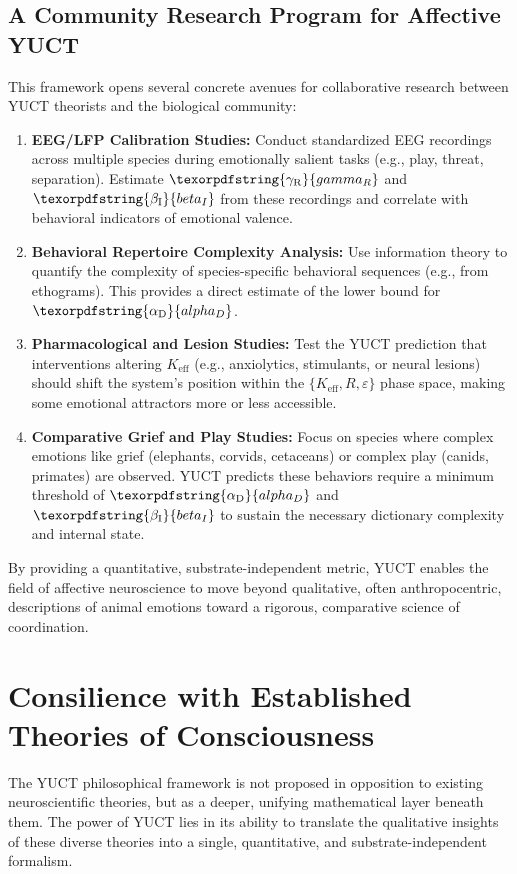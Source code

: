 \documentclass[12pt,a4paper]{article}
\DeclareRobustCommand{\alD}{\texorpdfstring{\ensuremath{\alpha_{\mathrm{D}}}}{alpha_D}}
\DeclareRobustCommand{\beI}{\texorpdfstring{\ensuremath{\beta_{\mathrm{I}}}}{beta_I}}
\DeclareRobustCommand{\gaR}{\texorpdfstring{\ensuremath{\gamma_{\mathrm{R}}}}{gamma_R}}
\begin{document}
	\subsection{A Community Research Program for Affective YUCT}
	
	This framework opens several concrete avenues for collaborative research between YUCT theorists and the biological community:
	
	\begin{enumerate}
		\item \textbf{EEG/LFP Calibration Studies:} Conduct standardized EEG recordings across multiple species during emotionally salient tasks (e.g., play, threat, separation). Estimate \(\gaR\) and \(\beI\) from these recordings and correlate with behavioral indicators of emotional valence.
		\item \textbf{Behavioral Repertoire Complexity Analysis:} Use information theory to quantify the complexity of species-specific behavioral sequences (e.g., from ethograms). This provides a direct estimate of the lower bound for \(\alD\).
		\item \textbf{Pharmacological and Lesion Studies:} Test the YUCT prediction that interventions altering \(K_{\mathrm{eff}}\) (e.g., anxiolytics, stimulants, or neural lesions) should shift the system's position within the \(\{K_{\mathrm{eff}}, R, \varepsilon\}\) phase space, making some emotional attractors more or less accessible.
		\item \textbf{Comparative Grief and Play Studies:} Focus on species where complex emotions like grief (elephants, corvids, cetaceans) or complex play (canids, primates) are observed. YUCT predicts these behaviors require a minimum threshold of \(\alD\) and \(\beI\) to sustain the necessary dictionary complexity and internal state.
	\end{enumerate}
	
	By providing a quantitative, substrate-independent metric, YUCT enables the field of affective neuroscience to move beyond qualitative, often anthropocentric, descriptions of animal emotions toward a rigorous, comparative science of coordination.
	
	\section{Consilience with Established Theories of Consciousness}
	
	The YUCT philosophical framework is not proposed in opposition to existing neuroscientific theories, but as a deeper, unifying mathematical layer beneath them. The power of YUCT lies in its ability to translate the qualitative insights of these diverse theories into a single, quantitative, and substrate-independent formalism.
	
\end{document}
